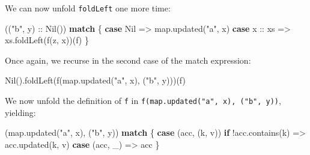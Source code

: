 \documentclass[ignorenonframetext,]{beamer}
\newenvironment{Shaded}{}{}
\newcommand{\FunctionTok}[1]{\textcolor[rgb]{0.02,0.16,0.49}{#1}}
\newcommand{\KeywordTok}[1]{\textcolor[rgb]{0.00,0.44,0.13}{\textbf{#1}}}
\newcommand{\NormalTok}[1]{#1}
\newcommand{\StringTok}[1]{\textcolor[rgb]{0.25,0.44,0.63}{#1}}
\begin{document}
\begin{frame}[fragile]

We can now unfold \texttt{foldLeft} one more time:

\begin{Shaded}
\begin{Highlighting}[]
\NormalTok{((}\StringTok{"b"}\NormalTok{, y) :: }\FunctionTok{Nil}\NormalTok{()) }\KeywordTok{match}\NormalTok{ \{}
  \KeywordTok{case}\NormalTok{ Nil     => map.}\FunctionTok{updated}\NormalTok{(}\StringTok{"a"}\NormalTok{, x)}
  \KeywordTok{case}\NormalTok{ x :: xs => xs.}\FunctionTok{foldLeft}\NormalTok{(}\FunctionTok{f}\NormalTok{(z, x))(f)}
\NormalTok{\}}
\end{Highlighting}
\end{Shaded}

\end{frame}

\begin{frame}[fragile]

Once again, we recurse in the second case of the match expression:

\begin{Shaded}
\begin{Highlighting}[]
\FunctionTok{Nil}\NormalTok{().}\FunctionTok{foldLeft}\NormalTok{(}\FunctionTok{f}\NormalTok{(map.}\FunctionTok{updated}\NormalTok{(}\StringTok{"a"}\NormalTok{, x), (}\StringTok{"b"}\NormalTok{, y)))(f)}
\end{Highlighting}
\end{Shaded}

\end{frame}

\begin{frame}[fragile]

We now unfold the definition of \texttt{f} in
\texttt{f(map.updated("a",\ x),\ ("b",\ y))}, yielding:

\begin{Shaded}
\begin{Highlighting}[]
\NormalTok{(map.}\FunctionTok{updated}\NormalTok{(}\StringTok{"a"}\NormalTok{, x), (}\StringTok{"b"}\NormalTok{, y)) }\KeywordTok{match}\NormalTok{ \{}
  \KeywordTok{case}\NormalTok{ (acc, (k, v)) }\KeywordTok{if}\NormalTok{ !acc.}\FunctionTok{contains}\NormalTok{(k) => acc.}\FunctionTok{updated}\NormalTok{(k, v)}
  \KeywordTok{case}\NormalTok{ (acc, _)                          => acc}
\NormalTok{\}}
\end{Highlighting}
\end{Shaded}

\end{frame}
\end{document}
